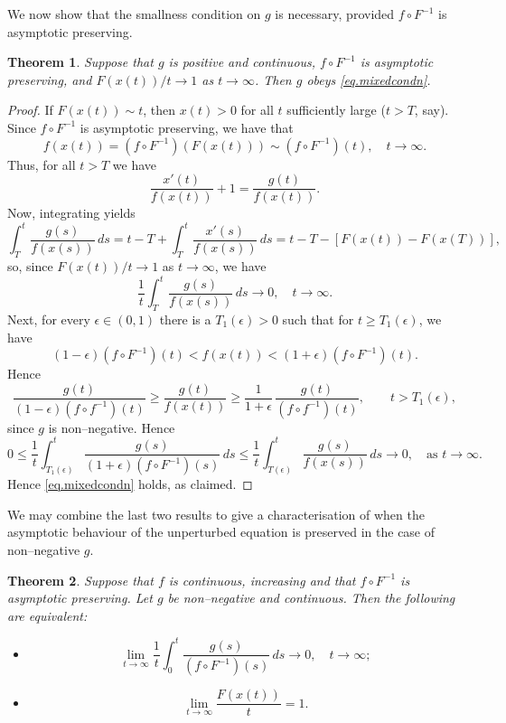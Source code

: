 \documentclass[a4paper,10pt,reqno]{amsart}
\numberwithin{equation}{section}
\newtheorem{theorem}{Theorem}
\theoremstyle{definition}
\theoremstyle{remark}
\DeclareMathOperator{\1}{\mathbbm 1}
\begin{document}
	We now show that the smallness condition on $g$ is necessary, provided $f\circ F^{-1}$ is asymptotic preserving.	
	\begin{theorem}
		Suppose that $g$ is positive and continuous, $f\circ F^{-1}$ is asymptotic preserving, and $F(x(t))/t\to 1$ as $t\to\infty$. Then $g$ obeys  \eqref{eq.mixedcondn}.
	\end{theorem}	
	\begin{proof} 
		If $F(x(t)) \sim t$, then $x(t)>0$ for all $t$ sufficiently large ($t>T$, say). Since $f \circ F^{-1}$ is asymptotic preserving, 
		we have that 
		\[
		f(x(t))=(f\circ F^{-1})(F(x(t)))\sim (f\circ F^{-1})(t), \quad t\to\infty.
		\]
		Thus, for all $t>T$ we have 
		\[
		\frac{x'(t)}{f(x(t))} +1 = \frac{g(t)}{f(x(t))}.
		\]
		Now, integrating yields 
		\[
		\int_T^t \frac{g(s)}{f(x(s))} \, ds = t - T + \int_T^t \frac{x'(s)}{f(x(s))} \, ds
		= t - T - [F(x(t)) - F(x(T))],
		\]
		so, since $F(x(t))/t\to 1$ as $t\to\infty$, we have 		
		\[
		\frac{1}{t} \int_T^t \frac{g(s)}{f(x(s))} \, ds \to 0, \quad t\to\infty. 
		\]
		Next, for every $\epsilon\in (0,1)$ there is a $T_1(\epsilon)>0$ such that for $t \geq T_{1}(\epsilon)$, we have
		\[
		(1-\epsilon)(f \circ F^{-1})(t) 
		< f(x(t)) 
		< (1+\epsilon)(f \circ F^{-1})(t).
		\]
		Hence
		\[
		\frac{g(t)}{(1-\epsilon)(f \circ f^{-1})(t)} 
		\geq \frac{g(t)}{f(x(t))} 
		\geq  \frac{1}{1+\epsilon} \, \frac{g(t)}{(f \circ f^{-1})(t)},
		\qquad t > T_{1}(\epsilon),
		\]
		since $g$ is non--negative. Hence			
		\[
		0 \leq \frac{1}{t} \int_{T_1(\epsilon)}^{t} \frac{g(s)}{(1+\epsilon)(f \circ F^{-1})(s)} \, ds
		\leq \frac{1}{t} \int_{T(\epsilon)}^{t} \frac{g(s)}{f(x(s))} \, ds \longrightarrow 0,
		\quad \text{as } t \to \infty.
		\]
		Hence \eqref{eq.mixedcondn} holds, as claimed. 
	\end{proof}
	We may combine the last two results to give a characterisation of when the asymptotic behaviour of the unperturbed equation is preserved in the case of non--negative $g$.
	\begin{theorem}
		Suppose that $f$ is continuous, increasing and that $f\circ F^{-1}$ is asymptotic preserving. Let $g$ be non--negative and continuous. Then the following are equivalent:
		\begin{itemize}
			\item[(A)] $$\lim_{t\to\infty} \frac{1}{t}\int_{0}^t \frac{g(s)}{(f\circ F^{-1})(s)}\,ds \to 0, \quad t\to\infty;$$
			\item[(B)] $$\lim_{t\to\infty} \frac{F(x(t))}{t}=1.$$
		\end{itemize}
	\end{theorem}		
\end{document}
